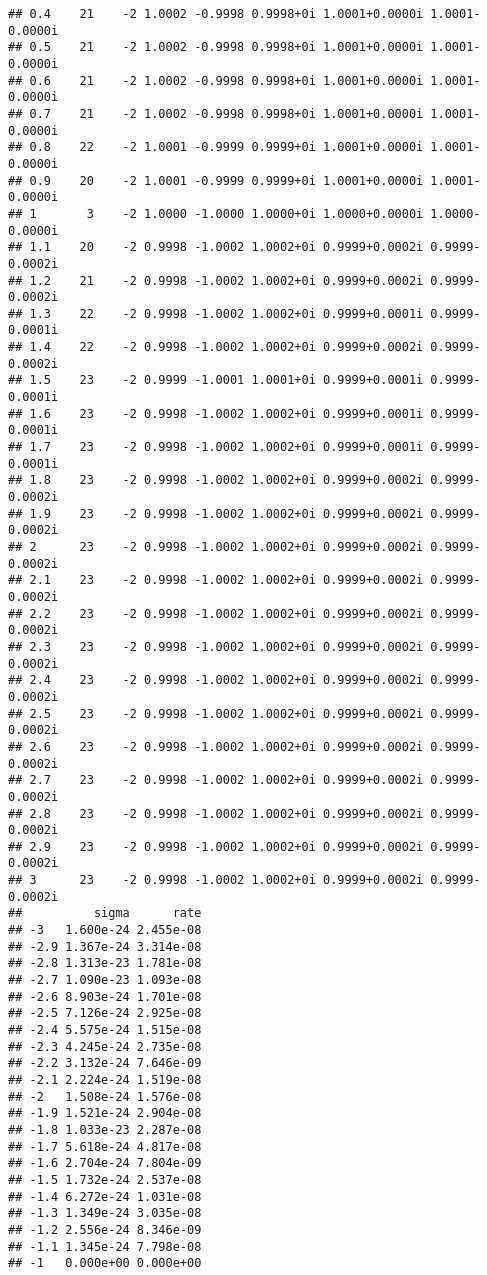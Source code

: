 \documentclass[
  12pt,
]{article}
\begin{document}
\begin{verbatim}
## 0.4    21    -2 1.0002 -0.9998 0.9998+0i 1.0001+0.0000i 1.0001-0.0000i
## 0.5    21    -2 1.0002 -0.9998 0.9998+0i 1.0001+0.0000i 1.0001-0.0000i
## 0.6    21    -2 1.0002 -0.9998 0.9998+0i 1.0001+0.0000i 1.0001-0.0000i
## 0.7    21    -2 1.0002 -0.9998 0.9998+0i 1.0001+0.0000i 1.0001-0.0000i
## 0.8    22    -2 1.0001 -0.9999 0.9999+0i 1.0001+0.0000i 1.0001-0.0000i
## 0.9    20    -2 1.0001 -0.9999 0.9999+0i 1.0001+0.0000i 1.0001-0.0000i
## 1       3    -2 1.0000 -1.0000 1.0000+0i 1.0000+0.0000i 1.0000-0.0000i
## 1.1    20    -2 0.9998 -1.0002 1.0002+0i 0.9999+0.0002i 0.9999-0.0002i
## 1.2    21    -2 0.9998 -1.0002 1.0002+0i 0.9999+0.0002i 0.9999-0.0002i
## 1.3    22    -2 0.9998 -1.0002 1.0002+0i 0.9999+0.0001i 0.9999-0.0001i
## 1.4    22    -2 0.9998 -1.0002 1.0002+0i 0.9999+0.0002i 0.9999-0.0002i
## 1.5    23    -2 0.9999 -1.0001 1.0001+0i 0.9999+0.0001i 0.9999-0.0001i
## 1.6    23    -2 0.9998 -1.0002 1.0002+0i 0.9999+0.0001i 0.9999-0.0001i
## 1.7    23    -2 0.9998 -1.0002 1.0002+0i 0.9999+0.0001i 0.9999-0.0001i
## 1.8    23    -2 0.9998 -1.0002 1.0002+0i 0.9999+0.0002i 0.9999-0.0002i
## 1.9    23    -2 0.9998 -1.0002 1.0002+0i 0.9999+0.0002i 0.9999-0.0002i
## 2      23    -2 0.9998 -1.0002 1.0002+0i 0.9999+0.0002i 0.9999-0.0002i
## 2.1    23    -2 0.9998 -1.0002 1.0002+0i 0.9999+0.0002i 0.9999-0.0002i
## 2.2    23    -2 0.9998 -1.0002 1.0002+0i 0.9999+0.0002i 0.9999-0.0002i
## 2.3    23    -2 0.9998 -1.0002 1.0002+0i 0.9999+0.0002i 0.9999-0.0002i
## 2.4    23    -2 0.9998 -1.0002 1.0002+0i 0.9999+0.0002i 0.9999-0.0002i
## 2.5    23    -2 0.9998 -1.0002 1.0002+0i 0.9999+0.0002i 0.9999-0.0002i
## 2.6    23    -2 0.9998 -1.0002 1.0002+0i 0.9999+0.0002i 0.9999-0.0002i
## 2.7    23    -2 0.9998 -1.0002 1.0002+0i 0.9999+0.0002i 0.9999-0.0002i
## 2.8    23    -2 0.9998 -1.0002 1.0002+0i 0.9999+0.0002i 0.9999-0.0002i
## 2.9    23    -2 0.9998 -1.0002 1.0002+0i 0.9999+0.0002i 0.9999-0.0002i
## 3      23    -2 0.9998 -1.0002 1.0002+0i 0.9999+0.0002i 0.9999-0.0002i
##          sigma      rate
## -3   1.600e-24 2.455e-08
## -2.9 1.367e-24 3.314e-08
## -2.8 1.313e-23 1.781e-08
## -2.7 1.090e-23 1.093e-08
## -2.6 8.903e-24 1.701e-08
## -2.5 7.126e-24 2.925e-08
## -2.4 5.575e-24 1.515e-08
## -2.3 4.245e-24 2.735e-08
## -2.2 3.132e-24 7.646e-09
## -2.1 2.224e-24 1.519e-08
## -2   1.508e-24 1.576e-08
## -1.9 1.521e-24 2.904e-08
## -1.8 1.033e-23 2.287e-08
## -1.7 5.618e-24 4.817e-08
## -1.6 2.704e-24 7.804e-09
## -1.5 1.732e-24 2.537e-08
## -1.4 6.272e-24 1.031e-08
## -1.3 1.349e-24 3.035e-08
## -1.2 2.556e-24 8.346e-09
## -1.1 1.345e-24 7.798e-08
## -1   0.000e+00 0.000e+00

\end{verbatim}
\end{document}
